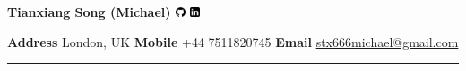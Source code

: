 \documentclass[9pt,a4paper]{article} %
\renewcommand{\title}[1]{
{\huge{\color{slateblue}\textbf{#1}}\\} %
}
\begin{document}
\thispagestyle{empty}
\pagestyle{empty}

\begin{center}
\title{Tianxiang Song (Michael) \href{https://github.com/Stx666Michael}{\includegraphics[width=0.022\textwidth]{images/github-logo.png}} \href{https://www.linkedin.com/in/tianxiang-song-113b3223a/}{\includegraphics[width=0.022\textwidth]{images/LinkedIn-logo.png}}}
\end{center}

\begin{center}
\textbf{Address} London, UK \hspace{1.2cm} 
\textbf{Mobile} +44 7511820745 \hspace{1.2cm} 
\textbf{Email} \href{mailto:stx666michael@gmail.com}{stx666michael@gmail.com}
\end{center}

\rule{\textwidth}{0.2mm}\\[-0.5em]
\end{document}
